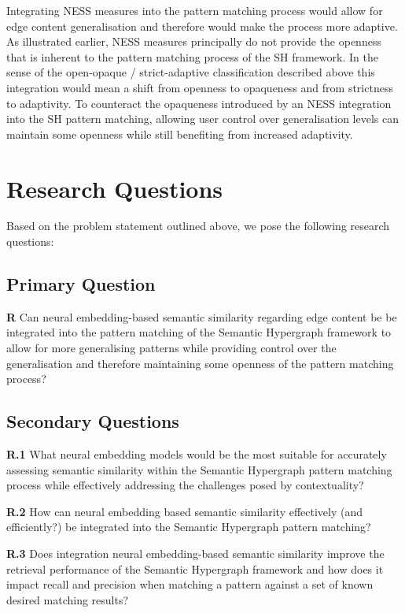 \documentclass[11pt]{scrreprt}
\begin{document}
Integrating NESS measures into the pattern matching process would allow for edge content generalisation and therefore would make the process more adaptive. As illustrated earlier, NESS measures principally do not provide the openness that is inherent to the pattern matching process of the SH framework. In the sense of the open-opaque / strict-adaptive classification described above this integration would mean a shift from openness to opaqueness and from strictness to adaptivity. To counteract the opaqueness introduced by an NESS integration into the SH pattern matching, allowing user control over generalisation levels can maintain some openness while still benefiting from increased adaptivity.

\section{Research Questions}
\label{sec:research-questions}
Based on the problem statement outlined above, we pose the following research questions:

\subsection{Primary Question}
\textbf{R} Can neural embedding-based semantic similarity regarding edge content be be integrated into the pattern matching of the Semantic Hypergraph framework to allow for more generalising patterns while providing control over the generalisation and therefore maintaining some openness of the pattern matching process?

\subsection{Secondary Questions}
\textbf{R.1} What neural embedding models would be the most suitable for accurately assessing semantic similarity within the Semantic Hypergraph pattern matching process while effectively addressing the challenges posed by contextuality?

\textbf{R.2} How can neural embedding based semantic similarity effectively (and efficiently?) be integrated into the Semantic Hypergraph pattern matching?

\textbf{R.3} Does integration neural embedding-based semantic similarity improve the retrieval performance of the Semantic Hypergraph framework and how does it impact recall and precision when matching a pattern against a set of known desired matching results?
\end{document}
